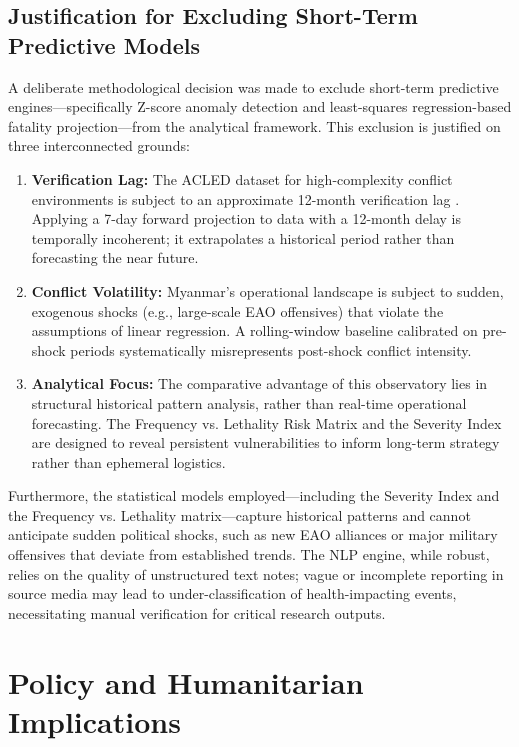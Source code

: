 \documentclass[conference]{IEEEtran}
\begin{document}
\subsection{Justification for Excluding Short-Term Predictive Models}
A deliberate methodological decision was made to exclude short-term predictive engines—specifically Z-score anomaly detection and least-squares regression-based fatality projection—from the analytical framework. This exclusion is justified on three interconnected grounds:
\begin{enumerate}
    \item \textbf{Verification Lag:} The ACLED dataset for high-complexity conflict environments is subject to an approximate 12-month verification lag \cite{acledmethodmyanmar}. Applying a 7-day forward projection to data with a 12-month delay is temporally incoherent; it extrapolates a historical period rather than forecasting the near future.
    \item \textbf{Conflict Volatility:} Myanmar's operational landscape is subject to sudden, exogenous shocks (e.g., large-scale EAO offensives) that violate the assumptions of linear regression. A rolling-window baseline calibrated on pre-shock periods systematically misrepresents post-shock conflict intensity.
    \item \textbf{Analytical Focus:} The comparative advantage of this observatory lies in structural historical pattern analysis, rather than real-time operational forecasting. The Frequency vs. Lethality Risk Matrix and the Severity Index are designed to reveal persistent vulnerabilities to inform long-term strategy rather than ephemeral logistics.
\end{enumerate}

Furthermore, the statistical models employed—including the Severity Index and the Frequency vs. Lethality matrix—capture historical patterns and cannot anticipate sudden political shocks, such as new EAO alliances or major military offensives that deviate from established trends. The NLP engine, while robust, relies on the quality of unstructured text notes; vague or incomplete reporting in source media may lead to under-classification of health-impacting events, necessitating manual verification for critical research outputs.

\section{Policy and Humanitarian Implications}
\end{document}
